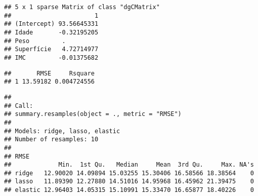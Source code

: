 \documentclass[]{article}
\newenvironment{Shaded}{\begin{snugshade}}{\end{snugshade}}
\newcommand{\CommentTok}[1]{\textcolor[rgb]{0.56,0.35,0.01}{\textit{#1}}}
\newcommand{\DataTypeTok}[1]{\textcolor[rgb]{0.13,0.29,0.53}{#1}}
\newcommand{\KeywordTok}[1]{\textcolor[rgb]{0.13,0.29,0.53}{\textbf{#1}}}
\newcommand{\NormalTok}[1]{#1}
\newcommand{\OperatorTok}[1]{\textcolor[rgb]{0.81,0.36,0.00}{\textbf{#1}}}
\newcommand{\StringTok}[1]{\textcolor[rgb]{0.31,0.60,0.02}{#1}}
\begin{document}
\begin{Shaded}
\end{Shaded}

\begin{verbatim}
## 5 x 1 sparse Matrix of class "dgCMatrix"
##                       1
## (Intercept) 93.56645331
## Idade       -0.32195205
## Peso         .         
## Superfície   4.72714977
## IMC         -0.01375682
\end{verbatim}

\begin{Shaded}
\end{Shaded}

\begin{verbatim}
##       RMSE     Rsquare
## 1 13.59182 0.004724556
\end{verbatim}

\begin{Shaded}
\end{Shaded}

\begin{verbatim}
## 
## Call:
## summary.resamples(object = ., metric = "RMSE")
## 
## Models: ridge, lasso, elastic 
## Number of resamples: 10 
## 
## RMSE 
##             Min.  1st Qu.   Median     Mean  3rd Qu.     Max. NA's
## ridge   12.90020 14.09894 15.03255 15.30406 16.58566 18.38564    0
## lasso   11.89390 12.27880 14.51016 14.95968 16.45962 21.39475    0
## elastic 12.96403 14.05315 15.10991 15.33470 16.65877 18.40226    0
\end{verbatim}
\end{document}
